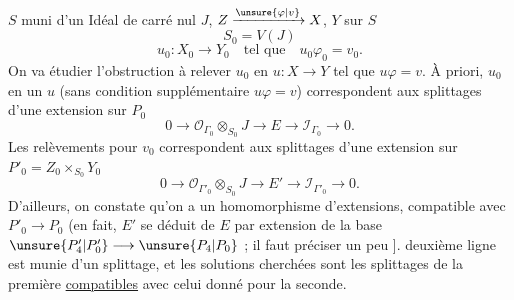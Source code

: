 $S$  muni d'un Idéal  de carré nul $J$,
$Z\xrightarrow{\unsure{\varphi|v}}X$, $Y$ sur $S$
\[
S_0=V(J)
\]
\[
u_0:X_0\longrightarrow Y_0\quad\text{tel que}\quad u_0\varphi_0=v_0.
\]
On va étudier l'obstruction à relever $u_0$ en $u:X\longrightarrow Y$
tel que $u\varphi=v$. 
À priori, 
$u_0$ en un $u$ (sans condition supplémentaire $u\varphi=v$)
correspondent aux splittages d'une extension sur $P_0$
\[
0\longrightarrow\mathcal{O}_{\Gamma_0}\otimes_{S_0}J\longrightarrow E\longrightarrow\mathcal{I}_{\Gamma_0}\longrightarrow0.
\]
Les relèvements pour $v_0$ correspondent aux splittages
d'une extension  sur $P'_0=Z_0\times_{S_0}Y_0$
\[
0\longrightarrow\mathcal{O}_{\Gamma'_0}\otimes_{S_0}J\longrightarrow E'\longrightarrow\mathcal{I}_{\Gamma'_0}\longrightarrow0.
\]
D'ailleurs, on constate qu'on a un homomorphisme
d'extensions, compatible avec $P'_0\longrightarrow P_0$
(en fait, $E'$ se déduit de $E$ par extension de
la base $\unsure{P'_4|P'_0}\longrightarrow\unsure{P_4|P_0}$  
;
\unsure{\}} il
faut préciser un peu ]. 
 deuxième ligne est
munie d'un splittage, et les solutions
cherchées sont les splittages de la première
\uline{compatibles} avec celui donné pour la seconde.

